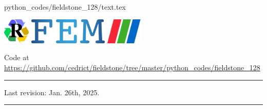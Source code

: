 \begin{flushright} {\tiny {\color{gray} python\_codes/fieldstone\_128/text.tex}} \end{flushright}

\noindent
\includegraphics[height=1.25cm]{images/pictograms/replication}
\includegraphics[height=1.25cm]{images/pictograms/FEM}
\includegraphics[height=1.25cm]{images/pictograms/paraview}


%

\begin{center}
\inpython
Code at \url{https://github.com/cedrict/fieldstone/tree/master/python_codes/fieldstone_128}
\end{center}

\par\noindent\rule{\textwidth}{0.4pt}


Last revision: Jan. 26th, 2025.

\par\noindent\rule{\textwidth}{0.4pt}


